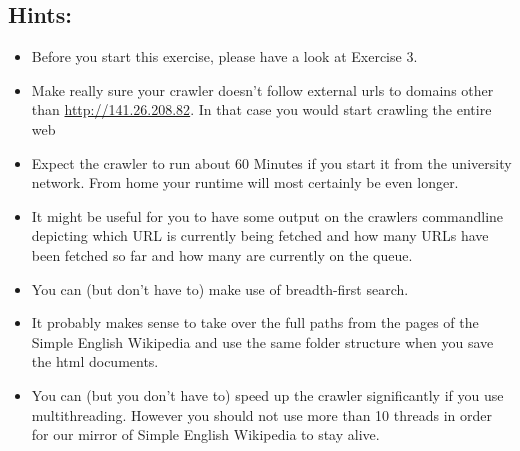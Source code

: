 \documentclass{WeSTassignment}
\begin{document}
\subsection{Hints:}
\begin{itemize}
\item Before you start this exercise, please have a look at Exercise 3. 
\item Make really sure your crawler doesn't follow external urls to domains other than \mbox{\url{http://141.26.208.82}}. In that case you would start crawling the entire web
\item Expect the crawler to run about 60 Minutes if you start it from the university network. From home your runtime will most certainly be even longer.
\item It might be useful for you to have some output on the crawlers commandline depicting which URL is currently being fetched and how many URLs have been fetched so far and how many are currently on the queue.
\item You can (but don't have to) make use of breadth-first search.
\item It probably makes sense to take over the full paths from the pages of the Simple English Wikipedia and use the same folder structure when you save the html documents.
\item You can (but you don't have to) speed up the crawler significantly if you use multithreading. However you should not use more than 10 threads in order for our mirror of Simple English Wikipedia to stay alive. 
\end{itemize}
\end{document}
